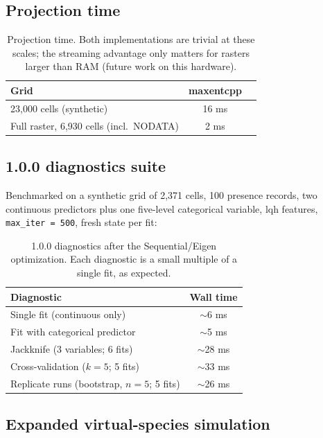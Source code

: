 \subsection{Projection time}

\begin{table}[h]
\centering
\small
\begin{tabular}{lcc}
\toprule
\textbf{Grid} & \textbf{maxentcpp} \\
\midrule
23,000 cells (synthetic) & 16 ms \\
Full raster, 6,930 cells (incl.\ NODATA) & 2 ms \\
\bottomrule
\end{tabular}
\caption{Projection time.  Both implementations are trivial at these
scales; the streaming advantage only matters for rasters larger than
RAM (future work on this hardware).}
\label{tab:proj}
\end{table}

\subsection{1.0.0 diagnostics suite}

Benchmarked on a synthetic grid of 2,371 cells, 100 presence records,
two continuous predictors plus one five-level categorical variable,
lqh features, \texttt{max\_iter = 500}, fresh state per fit:

\begin{table}[h]
\centering
\small
\begin{tabular}{lc}
\toprule
\textbf{Diagnostic} & \textbf{Wall time} \\
\midrule
Single fit (continuous only) & $\sim$6 ms \\
Fit with categorical predictor & $\sim$5 ms \\
Jackknife (3 variables; 6 fits) & $\sim$28 ms \\
Cross-validation ($k = 5$; 5 fits) & $\sim$33 ms \\
Replicate runs (bootstrap, $n = 5$; 5 fits) & $\sim$26 ms \\
\bottomrule
\end{tabular}
\caption{1.0.0 diagnostics after the Sequential/Eigen optimization.
Each diagnostic is a small multiple of a single fit, as expected.}
\label{tab:diag}
\end{table}

\subsection{Expanded virtual-species simulation}

